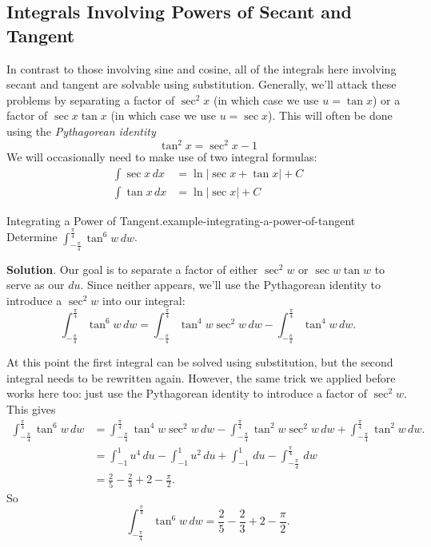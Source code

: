 \documentclass[10pt,]{book}
\numberwithin{equation}{section}
\begin{document}
\subsection[{Integrals Involving Powers of Secant and Tangent}]{Integrals Involving Powers of Secant and Tangent}\label{subsection-integrals-involving-powers-of-secant-and-tangent}
\hypertarget{p-531}{}%
In contrast to those involving sine and cosine, all of the integrals here involving secant and tangent are solvable using substitution. Generally, we'll attack these problems by separating a factor of \(\sec^{2}x\) (in which case we use \(u = \tan x\)) or a factor of \(\sec x\tan x\) (in which case we use \(u = \sec x\)). This will often be done using the \emph{Pythagorean identity}%
\begin{equation*}
\tan^{2}x = \sec^{2}x - 1 
\end{equation*}
We will occasionally need to make use of two integral formulas:%
\begin{align*}
\int\sec x\,dx & = \ln|\sec x + \tan x| + C \\
\int\tan x\,dx & = \ln|\sec x| + C 
\end{align*}
%
\begin{example}{Integrating a Power of Tangent.}{example-integrating-a-power-of-tangent}%
\hypertarget{p-532}{}%
Determine \(\int_{-\frac{\pi}{4}}^{\frac{\pi}{4}}\tan^{6}w\,dw\).%
\par\smallskip%
\noindent\textbf{Solution}.\hypertarget{solution-117}{}\quad%
\hypertarget{p-533}{}%
Our goal is to separate a factor of either \(\sec^{2}w\) or \(\sec w\tan w\) to serve as our \(du\). Since neither appears, we'll use the Pythagorean identity to introduce a \(\sec^{2}w\) into our integral:%
\begin{equation*}
\int_{-\frac{\pi}{4}}^{\frac{\pi}{4}}\tan^{6}w\,dw = \int_{-\frac{\pi}{4}}^{\frac{\pi}{4}}\tan^{4}w\sec^{2}w\,dw - \int_{-\frac{\pi}{4}}^{\frac{\pi}{4}}\tan^{4}w\,dw.
\end{equation*}
%
\par
\hypertarget{p-534}{}%
At this point the first integral can be solved using substitution, but the second integral needs to be rewritten again. However, the same trick we applied before works here too: just use the Pythagorean identity to introduce a factor of \(\sec^{2}w\). This gives%
\begin{align*}
\int_{-\frac{\pi}{4}}^{\frac{\pi}{4}}\tan^{6}w\,dw & = \int_{-\frac{\pi}{4}}^{\frac{\pi}{4}}\tan^{4}w\sec^{2}w\,dw - \int_{-\frac{\pi}{4}}^{\frac{\pi}{4}}\tan^{2}w\sec^{2}w\,dw + \int_{-\frac{\pi}{4}}^{\frac{\pi}{4}}\tan^{2}w\,dw.\\
& = \int_{-1}^{1}u^{4}\,du - \int_{-1}^{1}u^{2}\,du + \int_{-1}^{1}\,du - \int_{-\frac{\pi}{4}}^{\frac{\pi}{4}}\,dw \\
& = \frac{2}{5} - \frac{2}{3} + 2 - \frac{\pi}{2}. 
\end{align*}
So%
\begin{equation*}
\int_{-\frac{\pi}{4}}^{\frac{\pi}{4}}\tan^{6}w\,dw = \frac{2}{5} - \frac{2}{3} + 2 - \frac{\pi}{2}.
\end{equation*}
%
\end{example}
\end{document}
